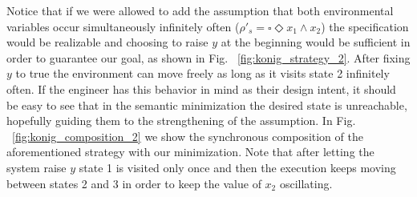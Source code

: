  Notice that if we were allowed to add the assumption that both environmental variables occur simultaneously infinitely often ($\rho'_s = \square \Diamond x_1 \wedge x_2$) the specification would be realizable and choosing to raise $y$ at the beginning would be sufficient in order to guarantee our goal, as shown in Fig. ~\ref{fig:konig_strategy_2}. After fixing $y$ to true the environment can move freely as long as it visits state 2 infinitely often. If the engineer has this behavior in mind as their design intent, it should be easy to see that in the semantic minimization the desired state is unreachable, hopefully guiding them to the strengthening of the assumption.  In Fig. ~\ref{fig:konig_composition_2} we show the synchronous composition of the aforementioned strategy with our minimization. Note that after letting the system raise $y$ state 1 is visited only once and then the execution keeps moving between states 2 and 3 in order to keep the value of $x_2$ oscillating.


